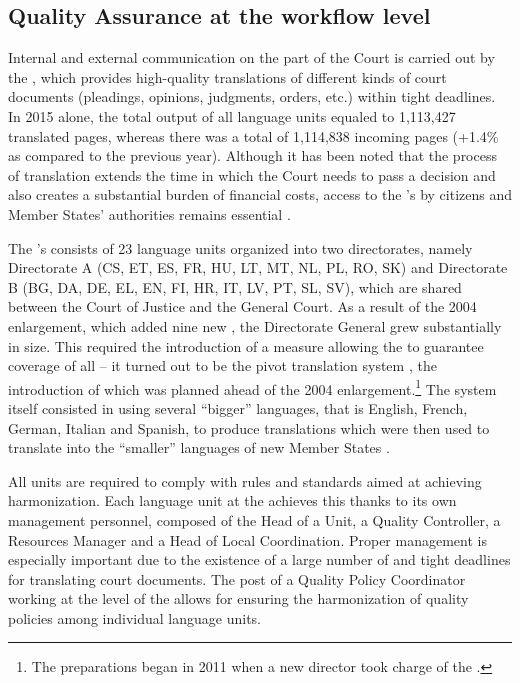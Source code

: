 \documentclass[output=paper]{langsci/langscibook}
\begin{document}
\subsection{Quality Assurance at the workflow level}\label{sec:kozbial:4.2}

Internal and external communication on the part of the Court is carried out by the , which provides high-quality translations of different kinds of court documents (pleadings, opinions, judgments, orders, etc.) within tight deadlines. In 2015 alone, the total output of all language units equaled to 1,113,427 translated pages, whereas there was a total of 1,114,838 incoming pages (+1.4\% as compared to the previous year). Although it has been noted that the process of translation extends the time in which the Court needs to pass a decision and also creates a substantial burden of financial costs, access to the ’s  by  citizens and Member States’ authorities remains essential \citep[23]{Roper2011}. 

The ’s  consists of 23 language units organized into two directorates, namely Directorate A (CS, ET, ES, FR, HU, LT, MT, NL, PL, RO, SK) and Directorate B (BG, DA, DE, EL, EN, FI, HR, IT, LV, PT, SL, SV), which are shared between the Court of Justice and the General Court. As a result of the 2004 enlargement, which added nine new , the Directorate General grew substantially in size. This required the introduction of a measure allowing the  to guarantee coverage of all  – it turned out to be the pivot translation system \citep[184]{Šarčević2013}, the introduction of which was planned ahead of the 2004 enlargement.\footnote{The preparations began in 2011 when a new director took charge of the .} The system itself consisted in using several “bigger” languages, that is English, French, German, Italian and Spanish, to produce translations which were then used to translate into the “smaller” languages of new Member States \citep[810–816]{McAuliffe2008}.

All units are required to comply with rules and standards aimed at achieving harmonization. Each language unit at the  achieves this thanks to its own management personnel, composed of the Head of a Unit, a Quality Controller, a Resources Manager and a Head of Local Coordination. Proper management is especially important due to the existence of a large number of  and tight deadlines for translating court documents. The post of a Quality Policy Coordinator working at the level of the  allows for ensuring the harmonization of quality policies among individual language units.
\end{document}
